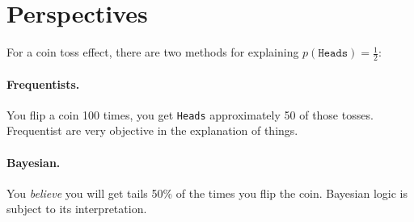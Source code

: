 \section{Perspectives}

For a coin toss effect, there are two methods for explaining $p(\texttt{Heads})=\frac{1}{2}$:

\paragraph{Frequentists.} 
You flip a coin 100 times, you get \texttt{Heads} approximately 50 of those tosses. 
Frequentist are very objective in the explanation of things. 

\paragraph{Bayesian.}
You \textit{believe} you will get tails 50\% of the times you flip the coin. 
Bayesian logic is subject to its interpretation. 


